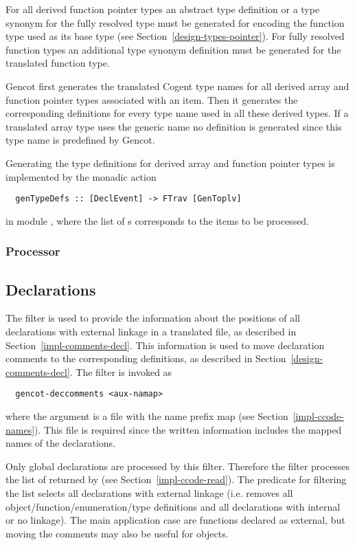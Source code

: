 For all derived function pointer types an abstract type definition or a type synonym for the fully resolved type 
must be generated for encoding the function type used as its base type (see Section~\ref{design-types-pointer}).
For fully resolved function types an additional type synonym definition must be generated for the translated function type.

Gencot first generates the translated Cogent type names for all derived array and function pointer types associated 
with an item. Then it generates the corresponding definitions for every type name
used in all these derived types. If a translated array type uses the generic name  no definition
is generated since this type name is predefined by Gencot.

Generating the type definitions for derived array and function pointer types is implemented by the monadic action
\begin{verbatim}
  genTypeDefs :: [DeclEvent] -> FTrav [GenToplv]
\end{verbatim}
in module , where the list of s corresponds to the items
to be processed.

\subsubsection{Processor }

\subsection{Declarations}
\label{impl-ccomps-decls}

The filter  is used to provide the information about the positions of all declarations with
external linkage in
a translated file, as described in Section~\ref{impl-comments-decl}. This information is used to move declaration
comments to the corresponding definitions, as described in Section~\ref{design-comments-decl}. The filter 
is invoked as
\begin{verbatim}
  gencot-deccomments <aux-namap>
\end{verbatim}
where the argument is a file  with the name prefix map (see Section~\ref{impl-ccode-names}).
This file is required since the written information includes the mapped names of the declarations.

Only global declarations are processed by this filter. Therefore the filter processes the list of 
returned by  (see Section~\ref{impl-ccode-read}). The predicate for filtering the list
selects all declarations with external linkage (i.e. removes all object/function/enumeration/type definitions and 
all declarations with internal or no linkage). 
The main application case are functions declared as external, but moving the comments may also be useful for 
objects.

